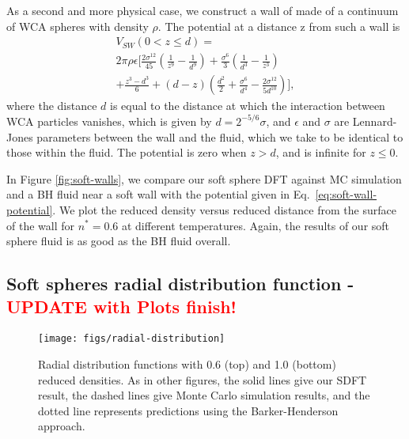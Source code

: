 \documentclass[letterpaper,twocolumn,amsmath,amssymb,prb]{revtex4-1}
\begin{document}
As a second and more physical case, we construct a wall of made of a
continuum of WCA spheres with density $\rho$.  The potential
at a distance z from such a wall is
\begin{multline}
  V_{SW}(0 < z \leq d) = \\
  2\pi\rho\epsilon\Big[
  \frac{2\sigma^{12}}{45} \left(\frac{1}{z^9}-\frac{1}{d^9}\right)
  +\frac{\sigma^6}{3}\left(\frac{1}{d^3}-\frac{1}{z^3}
  \right) \\
  + \frac{z^3-d^3}{6} + \left( d - z \right)\left(\frac{d^2}{2} +
  \frac{\sigma^6}{d^4} - \frac{2\sigma^{12}}{5d^{10}}\right)
  \Bigg],
\label{eq:soft-wall-potential}
\end{multline}
where the distance $d$ is equal to the distance at which the
interaction between WCA particles vanishes, which is given by $d =
2^{-5/6}\sigma$, and $\epsilon$ and $\sigma$ are Lennard-Jones
parameters between the wall and the fluid, which we take to be
identical to those within the fluid. The potential is zero when $z>d$,
and is infinite for $z\leq 0$.

In Figure \ref{fig:soft-walls}, we compare our soft sphere DFT
against MC simulation and a BH fluid near a soft wall
with the potential given in Eq.~\ref{eq:soft-wall-potential}. We
plot the reduced density versus reduced distance from the surface of
the wall for $n^*=0.6$ at different temperatures. Again, the results
of our soft sphere fluid is as good as the BH fluid
overall.

\subsection{Soft spheres radial distribution function - \textcolor{red}{UPDATE with Plots finish!}}

\begin{figure}
\begin{center}
  \texttt{[image: figs/radial-distribution]}
\end{center}
\caption{Radial distribution functions with 0.6 (top) and 1.0 (bottom)
  reduced densities. As in other figures, the solid lines give our
  SDFT result, the dashed lines give Monte Carlo simulation results,
  and the dotted line represents predictions using the
  Barker-Henderson approach.}
\label{fig:radial-distribution}
\end{figure}
\end{document}
